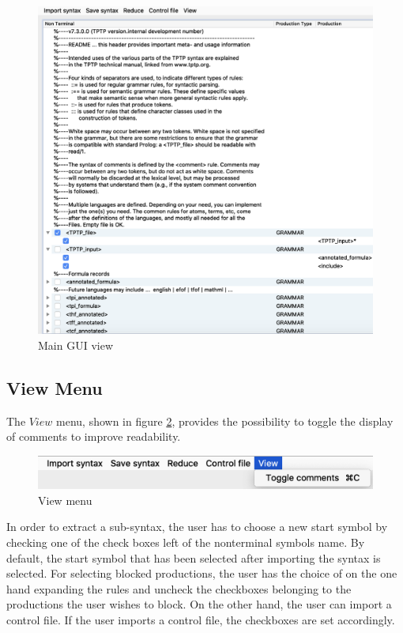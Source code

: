\begin{figure}[H]
\centering
\includegraphics[width=1\textwidth]{images/gui.png}
\caption{Main GUI view}
\label{fig:gui}
\end{figure}

\subsection{View Menu}\label{sec:ConceptGUIViewMenu}

The $View$ menu, shown in figure \ref{fig:view}, provides the possibility to toggle the display of comments to improve readability.

\begin{figure}[H]
\centering
\includegraphics[width=.7\textwidth]{images/view.png}
\caption{View menu}
\label{fig:view}
\end{figure}

In order to extract a sub-syntax, the user has to choose a new start symbol by checking one of the check boxes left of the nonterminal symbols name. By default, the start symbol that has been selected after importing the syntax is selected. For selecting blocked productions, the user has the choice of on the one hand expanding the rules and uncheck the checkboxes belonging to the productions the user wishes to block. On the other hand, the user can import a control file. If the user imports a control file, the checkboxes are set accordingly.

